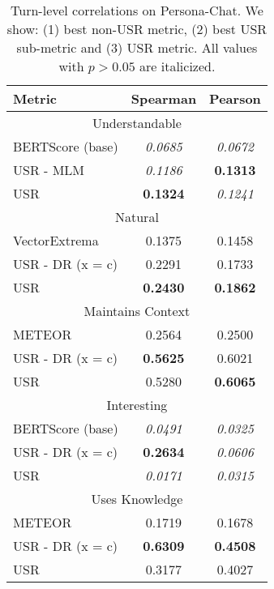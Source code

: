 \documentclass[11pt,a4paper]{article}
\begin{document}
\begin{table}
\centering
\begin{tabular}{|l|c|c|}
\hline
Metric                    & Spearman & Pearson  \\\hline
\multicolumn{3}{|c|}{Understandable} \\ \hline
BERTScore (base)          & \textit{0.0685}   & \textit{0.0672}   \\
USR - MLM               & \textit{0.1186}   & \textbf{0.1313}   \\
USR                       & \textbf{0.1324}   & \textit{0.1241}   \\
\hline
\multicolumn{3}{|c|}{Natural} \\ \hline
VectorExtrema             & 0.1375   & 0.1458   \\
USR - DR (x = c)          & 0.2291   & 0.1733  \\
USR                       & \textbf{0.2430}   & \textbf{0.1862}   \\\hline
\multicolumn{3}{|c|}{Maintains Context} \\ \hline
METEOR                    & 0.2564   & 0.2500   \\
USR - DR (x = c)   & \textbf{0.5625}  & 0.6021   \\
USR                       & 0.5280   & \textbf{0.6065}   \\\hline
\multicolumn{3}{|c|}{Interesting} \\ \hline
BERTScore (base)          & \textit{0.0491}  & \textit{0.0325}  \\
USR - DR (x = c)   & \textbf{0.2634}   &  \textit{0.0606}   \\
USR                       & \textit{0.0171}   & \textit{0.0315}   \\\hline
\multicolumn{3}{|c|}{Uses Knowledge} \\ \hline
METEOR                    & 0.1719  & 0.1678   \\
USR - DR (x = c)   & \textbf{0.6309}   &  \textbf{0.4508}   \\
USR                       & 0.3177   & 0.4027   \\\hline

\end{tabular}
\caption{Turn-level correlations on Persona-Chat. We show: (1) best non-USR metric, (2) best USR sub-metric and (3) USR metric. All values with $p > 0.05$ are italicized.}
\label{tab:all_turn_pc}
\end{table}
\end{document}
